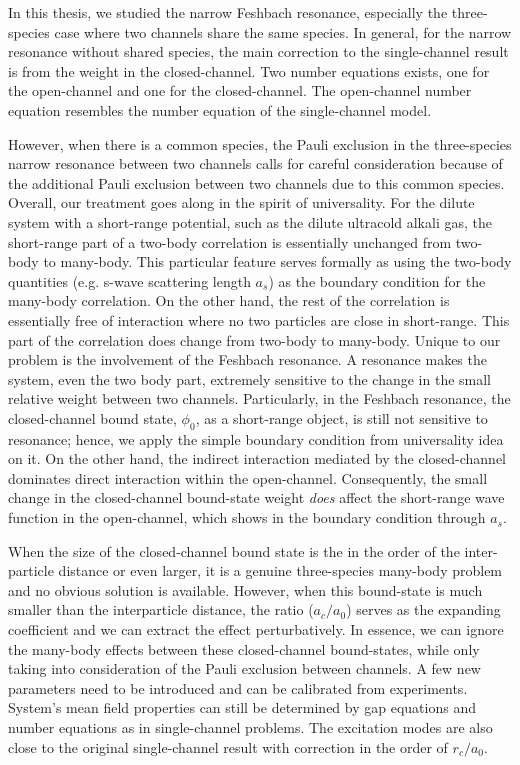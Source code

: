 % 
In this thesis, we studied the narrow Feshbach resonance, especially the three-species case where two channels share the same species.  In general, for the narrow resonance without shared species, the main correction to the single-channel result is from the weight in the closed-channel.  Two number equations exists, one for the open-channel and one for the closed-channel.  The open-channel number equation resembles the number equation of the single-channel model.

However, when there is a common species,  the Pauli exclusion in the three-species narrow resonance between two channels calls for careful  consideration because of the additional Pauli exclusion between two channels due to this common species.  Overall, our treatment goes along in the spirit of universality.  For the dilute system with a short-range potential, such as the dilute ultracold alkali gas, the short-range part of a two-body correlation is essentially unchanged from two-body  to many-body.  This particular feature serves formally as using the two-body quantities (e.g. s-wave scattering length $a_{s}$) as the boundary condition for the many-body correlation.  On the other hand, the rest of the correlation is essentially free of interaction where no two particles are close in short-range. This part of the correlation does change from two-body to many-body.  Unique to our problem is the involvement of the Feshbach resonance.  A resonance makes the system, even the two body part, extremely sensitive to the change in the small relative weight between two channels. Particularly, in the Feshbach resonance, the closed-channel bound state, $\phi_{0}$, as a short-range object,  is still not sensitive to resonance; hence, we apply the simple boundary condition from universality idea on it. On the other hand, the indirect interaction mediated by the closed-channel dominates direct interaction within the open-channel. Consequently, the small change in the closed-channel bound-state weight \emph{does} affect the short-range wave function in the open-channel, which shows in the boundary condition through $a_{s}$. 

When the size of  the closed-channel bound state is the in the order of the   inter-particle distance or even larger, it is a genuine three-species many-body problem and no obvious solution is available.  However, when this bound-state is much smaller than the interparticle distance, the ratio ($a_{c}/a_{0}$) serves as the expanding coefficient and we can extract  the effect perturbatively.  In essence, we can ignore the many-body effects between these closed-channel bound-states, while only taking into consideration of the Pauli exclusion between channels.  A few new parameters need to be introduced and can be calibrated from experiments.  System's mean field properties can still be determined by gap equations and number equations as in single-channel problems.  The excitation modes are also close to the original single-channel result with correction in the order of $r_{c}/a_{0}$.


